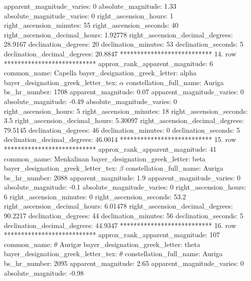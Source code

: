          apparent_magnitude_varies: 0
                absolute_magnitude: 1.33
         absolute_magnitude_varies: 0
             right_ascension_hours: 1
           right_ascension_minutes: 55
           right_ascension_seconds: 40
     right_ascension_decimal_hours: 1.92778
   right_ascension_decimal_degrees: 28.9167
               declination_degrees: 20
               declination_minutes: 53
               declination_seconds: 5
       declination_decimal_degrees: 20.8847
*************************** 14. row ***************************
    approx_rank_apparent_magnitude: 6
                       common_name: Capella
    bayer_designation_greek_letter: alpha
bayer_designation_greek_letter_tex: $\alpha$
           constellation_full_name: Auriga
                      bs_hr_number: 1708
                apparent_magnitude: 0.07
         apparent_magnitude_varies: 0
                absolute_magnitude: -0.49
         absolute_magnitude_varies: 0
             right_ascension_hours: 5
           right_ascension_minutes: 18
           right_ascension_seconds: 3.5
     right_ascension_decimal_hours: 5.30097
   right_ascension_decimal_degrees: 79.5145
               declination_degrees: 46
               declination_minutes: 0
               declination_seconds: 5
       declination_decimal_degrees: 46.0014
*************************** 15. row ***************************
    approx_rank_apparent_magnitude: 41
                       common_name: Menkalinan
    bayer_designation_greek_letter: beta
bayer_designation_greek_letter_tex: $\beta$
           constellation_full_name: Auriga
                      bs_hr_number: 2088
                apparent_magnitude: 1.9
         apparent_magnitude_varies: 0
                absolute_magnitude: -0.1
         absolute_magnitude_varies: 0
             right_ascension_hours: 6
           right_ascension_minutes: 0
           right_ascension_seconds: 53.2
     right_ascension_decimal_hours: 6.01478
   right_ascension_decimal_degrees: 90.2217
               declination_degrees: 44
               declination_minutes: 56
               declination_seconds: 5
       declination_decimal_degrees: 44.9347
*************************** 16. row ***************************
    approx_rank_apparent_magnitude: 107
                       common_name: $\theta$ Aurig{\ae}
    bayer_designation_greek_letter: theta
bayer_designation_greek_letter_tex: $\theta$
           constellation_full_name: Auriga
                      bs_hr_number: 2095
                apparent_magnitude: 2.65
         apparent_magnitude_varies: 0
                absolute_magnitude: -0.98
